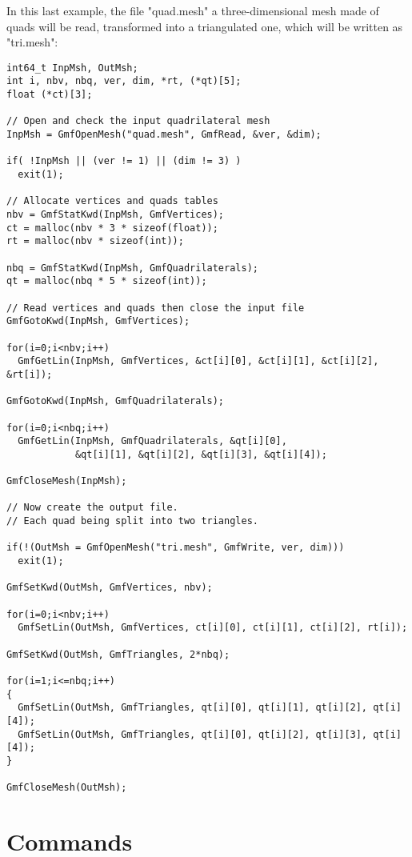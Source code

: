 \documentclass[a4paper,12pt]{article}
\begin{document}
In this last example, the file "quad.mesh" a three-dimensional mesh made of quads will be read, transformed into a triangulated one, which will be written as "tri.mesh":

\begin{tt}
\begin{verbatim}
int64_t InpMsh, OutMsh;
int i, nbv, nbq, ver, dim, *rt, (*qt)[5];
float (*ct)[3];

// Open and check the input quadrilateral mesh
InpMsh = GmfOpenMesh("quad.mesh", GmfRead, &ver, &dim);

if( !InpMsh || (ver != 1) || (dim != 3) )
  exit(1);

// Allocate vertices and quads tables
nbv = GmfStatKwd(InpMsh, GmfVertices);
ct = malloc(nbv * 3 * sizeof(float));
rt = malloc(nbv * sizeof(int));

nbq = GmfStatKwd(InpMsh, GmfQuadrilaterals);
qt = malloc(nbq * 5 * sizeof(int));

// Read vertices and quads then close the input file
GmfGotoKwd(InpMsh, GmfVertices);

for(i=0;i<nbv;i++)
  GmfGetLin(InpMsh, GmfVertices, &ct[i][0], &ct[i][1], &ct[i][2], &rt[i]);

GmfGotoKwd(InpMsh, GmfQuadrilaterals);

for(i=0;i<nbq;i++)
  GmfGetLin(InpMsh, GmfQuadrilaterals, &qt[i][0],
            &qt[i][1], &qt[i][2], &qt[i][3], &qt[i][4]);

GmfCloseMesh(InpMsh);

// Now create the output file.
// Each quad being split into two triangles.

if(!(OutMsh = GmfOpenMesh("tri.mesh", GmfWrite, ver, dim)))
  exit(1);

GmfSetKwd(OutMsh, GmfVertices, nbv);

for(i=0;i<nbv;i++)
  GmfSetLin(OutMsh, GmfVertices, ct[i][0], ct[i][1], ct[i][2], rt[i]);

GmfSetKwd(OutMsh, GmfTriangles, 2*nbq);

for(i=1;i<=nbq;i++)
{
  GmfSetLin(OutMsh, GmfTriangles, qt[i][0], qt[i][1], qt[i][2], qt[i][4]);
  GmfSetLin(OutMsh, GmfTriangles, qt[i][0], qt[i][2], qt[i][3], qt[i][4]);
}

GmfCloseMesh(OutMsh);
\end{verbatim}
\end{tt}
\normalfont


%
%

\newpage
\section{Commands}
\end{document}
